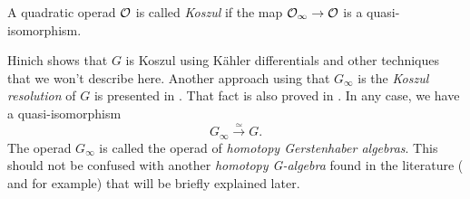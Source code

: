 \documentclass[TFM.tex]{subfiles}
\begin{document}
\begin{defi}
A quadratic operad ${\mathcal O}$ is called \emph{Koszul} if the map ${\mathcal O}_\infty\to {\mathcal O}$ is a quasi-isomorphism.
\end{defi}

Hinich \cite{Hinich} shows that $G$ is Koszul using Kähler differentials and other techniques that we won't describe here. Another approach using that $G_\infty$ is the \emph{Koszul resolution} of $G$ is presented in \cite{AlgebraicOperads}. That fact is also proved in \cite{GJHinich}. In any case, we have a  quasi-isomorphism %
\begin{equation}\label{equivalence}
G_\infty\xrightarrow{\simeq} G.
\end{equation}
The operad $G_\infty$ is called the operad of \emph{homotopy Gerstenhaber algebras}. This should not be confused with another \emph{homotopy G-algebra} found in the literature (\cite{VO} and \cite{VGH} for example) that will be briefly explained later. 


%






\end{document}
